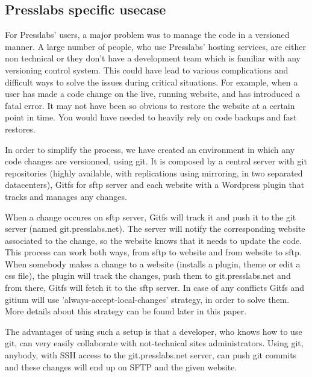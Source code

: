 \subsection{Presslabs specific usecase}
For Presslabs' users, a major problem was to manage the code in a versioned manner. A large number of people, who use Presslabs' hosting services, are either non technical or they don't have a development team which is familiar with any versioning control system. This could have lead to various complications and difficult ways to solve the issues during critical situations. For example, when a user has made a code change on the live, running website, and has introduced a fatal error. It may not have been so obvious to restore the website at a certain point in time. You would have needed to heavily rely on code backups and fast restores.

In order to simplify the process, we have created an environment in which any code changes are versionned, using git. It is composed by a central server with git repositories (highly available, with replications using mirroring, in two separated datacenters), Gitfs for sftp server and each website with a Wordpress plugin that tracks and manages any changes.

When a change occures on sftp server, Gitfs will track it and push it to the git server (named git.presslabs.net). The server will notify the corresponding website associated to the change, so the website knows that it needs to update the code. This process can work both ways, from sftp to website and from website to sftp. When somebody makes a change to a website (installs a plugin, theme or edit a css file), the plugin will track the changes, push them to git.presslabs.net and from there, Gitfs will fetch it to the sftp server. In case of any conflicts Gitfs and gitium will use 'always-accept-local-changes' strategy, in order to solve them. More details about this strategy can be found later in this paper.

The advantages of using such a setup is that a developer, who knows how to use git, can very easily collaborate with not-technical sites administrators. Using git, anybody, with SSH access to the git.presslabs.net server, can push git commits and these changes will end up on SFTP and the given website.